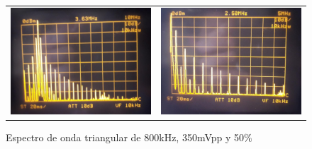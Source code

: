 \begin{figure}[H]
    \centering
    \begin{tabular}{c c}
        \includegraphics[scale=0.18]{../Mediciones/Ejercicio_2/ej2_triangular_50.jpeg} &
        \includegraphics[scale=0.18]{../Mediciones/Ejercicio_2/ej2_triangular_50_zoom.jpeg}
    \end{tabular}
    \caption{Espectro de onda triangular de 800kHz, 350mVpp y 50$\%$}
    \label{ej2_triangular_50}
\end{figure}

